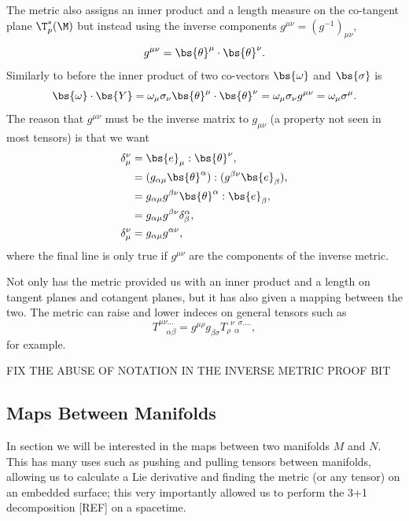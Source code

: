 The metric also assigns an inner product and a length measure on the co-tangent plane $\T^*_p(\M)$ but instead using the inverse components $g^{\mu\nu} = (g^{-1})_{\mu\nu}$,
\begin{equation}
g^{\mu\nu} = \bs{\theta}^\mu \cdot \bs{\theta}^\nu.
\end{equation}
Similarly to before the inner product of two co-vectors $\bs{\omega}$ and $\bs{\sigma}$ is
\begin{equation}
\bs{\omega} \cdot \bs{Y} = \omega_\mu \sigma_\nu \bs{\theta}^\mu \cdot \bs{\theta}^\nu = \omega_\mu \sigma_\nu g^{\mu\nu} = \omega_\mu \sigma^\mu.
\end{equation}
The reason that $g^{\mu\nu}$ must be the inverse matrix to $g_{\mu\nu}$ (a property not seen in most tensors) is that we want 
\begin{align}
\delta_\mu^\nu &= \bs{e}_\mu : \bs{\theta}^\nu   ,\\
  &= (g_{\alpha \mu} \bs{\theta}^\alpha) : (g^{\beta\nu} \bs{e}_{\beta}) ,\\
  &= g_{\alpha \mu}g^{\beta\nu}  \bs{\theta}^\alpha : \bs{e}_{\beta} ,\\
    &= g_{\alpha \mu}g^{\beta\nu}  \delta^\alpha_\beta ,\\
  \delta_\mu^\nu  &= g_{\alpha \mu}g^{\alpha\nu} ,
\end{align}
where the final line is only true if $g^{\mu\nu}$ are the components of the inverse metric.

Not only has the metric provided us with an inner product and a length on tangent planes and cotangent planes, but it has also given a mapping between the two. The metric can raise and lower indeces on general tensors such as
\begin{equation}
T^{\mu\nu ...}_{\,\,\,\,\,\, \alpha \beta} = g^{\mu\rho}g_{\beta\sigma}T^{\,\,\, \nu \,\,\, \sigma ....}_{\rho \,\,\, \alpha},
\end{equation}
for example. 


FIX THE ABUSE OF NOTATION IN THE INVERSE METRIC PROOF BIT




\subsection{Maps Between Manifolds}\label{sect:map}
In section we will be interested in the maps between two manifolds $M$ and $N$. This has many uses such as pushing and pulling tensors between manifolds, allowing us to calculate a Lie derivative and finding the metric (or any tensor) on an embedded surface; this very importantly allowed us to perform the 3+1 decomposition [REF] on a spacetime.

